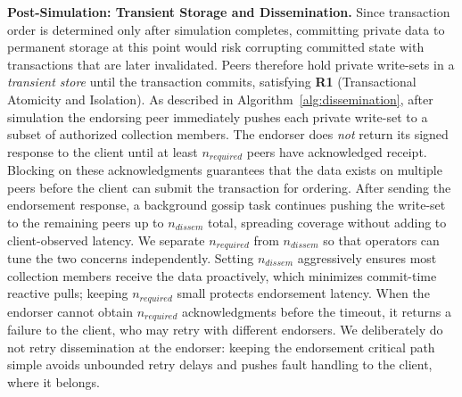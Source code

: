 \noindent\textbf{Post-Simulation: Transient Storage and Dissemination.}
Since transaction order is determined only after simulation completes, committing private data to permanent storage at this point would risk corrupting committed state with transactions that are later invalidated. Peers therefore hold private write-sets in a \textit{transient store} until the transaction commits, satisfying \textbf{R1} (Transactional Atomicity and Isolation).
As described in Algorithm~\ref{alg:dissemination}, after simulation the endorsing peer immediately pushes each private write-set to a subset of authorized collection members. The endorser does \textit{not} return its signed response to the client until at least $n_{required}$ peers have acknowledged receipt. Blocking on these acknowledgments guarantees that the data exists on multiple peers before the client can submit the transaction for ordering. After sending the endorsement response, a background gossip task continues pushing the write-set to the remaining peers up to $n_{dissem}$ total, spreading coverage without adding to client-observed latency.
We separate $n_{required}$ from $n_{dissem}$ so that operators can tune the two concerns independently. Setting $n_{dissem}$ aggressively ensures most collection members receive the data proactively, which minimizes commit-time reactive pulls; keeping $n_{required}$ small protects endorsement latency.
When the endorser cannot obtain $n_{required}$ acknowledgments before the timeout, it returns a failure to the client, who may retry with different endorsers. We deliberately do not retry dissemination at the endorser: keeping the endorsement critical path simple avoids unbounded retry delays and pushes fault handling to the client, where it belongs.
\vspace{0.2cm}
